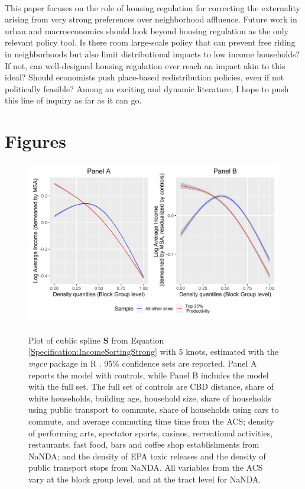 \documentclass[12pt]{article}
\begin{document}
	\paragraph*{}
	This paper focuses on the role of housing regulation for correcting the externality arising from very strong preferences over neighborhood affluence. Future work in urban and macroeconomics should look beyond housing regulation as the only relevant policy tool. Is there room large-scale policy that can prevent free riding in neighborhoods but also limit distributional impacts to low income households? If not, can well-designed housing regulation ever reach an impact akin to this ideal? Should economists push place-based redistribution policies, even if not politically feasible? Among an exciting and dynamic literature, I hope to push this line of inquiry as far as it can go.
	
	
	\newpage
	\scriptsize
	
	
	
	\newpage
	\section*{Figures}
	
		\begin{figure}[htbp!]
		\begin{center}
			\includegraphics[width=\textwidth]{income_combined.png}
			\caption{ \\ Plot of cublic spline $\mathbf{S}$ from Equation \eqref{Specification:IncomeSortingStrong} with 5 knots, estimated with the \textit{mgcv} package in R \citep{gampackage}. 95\% confidence sets are reported. Panel A reports the model with  controls, while Panel B includes the model with the full set. The full set of controls are CBD distance, share of white households, building age, household size, share of households using public transport to commute, share of households using cars to commute, and average commuting time time from the ACS; density of performing arts, spectator sports, casinos, recreational activities, restaurants, fast food, bars and coffee shop establishments from NaNDA; and the density of EPA toxic releases and the density of public transport stops from NaNDA. All variables from the ACS vary at the block group level, and at the tract level for NaNDA.  }\label{Figure:IncomeSortingStrong}
		\end{center}
	\end{figure}
	
\end{document}
